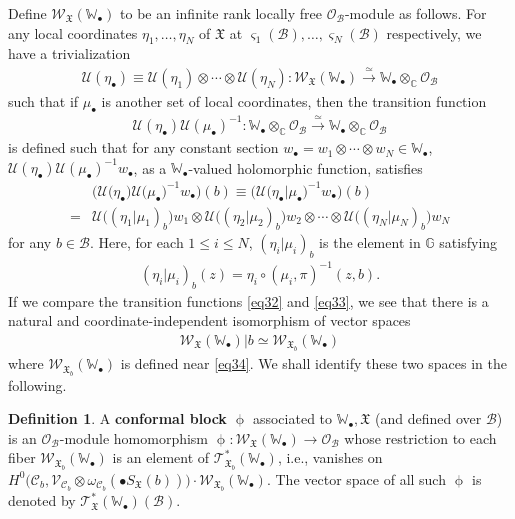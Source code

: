\documentclass[11pt,b5paper,notitlepage]{article}
\theoremstyle{definition}
\newtheorem{df}{Definition}[section]
\theoremstyle{plain}
\newcommand{\fk}{\mathfrak}
\newcommand{\mc}{\mathcal}
\newcommand{\scr}{\mathscr}
\newcommand{\sgm}{\varsigma}
\newcommand{\SX}{S_{\fk X}}
\newcommand{\blt}{\bullet}
\newcommand{\Wbb}{\mathbb W}
\newcommand{\Gbb}{\mathbb G}
\newcommand{\Cbb}{\mathbb C}
\numberwithin{equation}{section}
\begin{document}
Define $\scr W_{\fk X}(\Wbb_\blt)$ \index{WX@$\scr W_{\fk X}(\Wbb_\blt)$} to be an infinite rank locally free $\scr O_{\mc B}$-module as follows. For any  local coordinates $\eta_1,\dots,\eta_N$ of $\fk X$ at $\sgm_1(\mc B),\dots,\sgm_N(\mc B)$ respectively, we have a trivialization \index{U@$\mc U(\eta_\blt)$}
\begin{align}
\mc U(\eta_\blt)\equiv \mc U(\eta_1)\otimes\cdots\otimes\mc U(\eta_N):\scr W_{\fk X}(\Wbb_\blt)\xrightarrow{\simeq}\Wbb_\blt\otimes_\Cbb\scr O_{\mc B}\label{eq37}
\end{align}
such that if $\mu_\blt$ is another set of local coordinates, then the transition function
\begin{align*}
\mc U(\eta_\blt)\mc U(\mu_\blt)^{-1}:\Wbb_\blt\otimes_\Cbb\scr O_{\mc B}\xrightarrow{\simeq}\Wbb_\blt\otimes_\Cbb\scr O_{\mc B}
\end{align*}
is defined such that for any constant section $w_\blt=w_1\otimes\cdots\otimes w_N\in\Wbb_\blt$, $\mc U(\eta_\blt)\mc U(\mu_\blt)^{-1}w_\blt$, as a $\Wbb_\blt$-valued holomorphic function, satisfies
\begin{align}
&\Big(\mc U\big(\eta_\blt\big)\mc U\big(\mu_\blt\big)^{-1}w_\blt\Big )(b)\equiv \Big(\mc U\big(\eta_\blt\big|\mu_\blt\big)^{-1}w_\blt\Big )(b)\nonumber\\
=&\mc U\big((\eta_1|\mu_1)_b \big)w_1\otimes\mc U\big((\eta_2|\mu_2)_b \big)w_2\otimes\cdots\otimes \mc U\big((\eta_N|\mu_N)_b \big)w_N \label{eq33}
\end{align}
for any $b\in \mc B$. Here, for each $1\leq i\leq N$, $(\eta_i|\mu_i)_b$ is the element in $\Gbb$ satisfying
\begin{align}
(\eta_i|\mu_i)_b(z)=\eta_i\circ(\mu_i,\pi)^{-1}(z,b).
\end{align}
If we compare the transition functions \eqref{eq32} and \eqref{eq33}, we see that there is a natural and coordinate-independent isomorphism of vector spaces
\begin{align*}
\scr W_{\fk X}(\Wbb_\blt)|b\simeq \scr W_{\fk X_b}(\Wbb_\blt)
\end{align*}
where $\scr W_{\fk X_b}(\Wbb_\blt)$ is defined near \eqref{eq34}. We shall identify these two spaces in the following.


\begin{df}\label{lb17}
A \textbf{conformal block} $\upphi$ associated to $\Wbb_\blt,\fk X$ (and defined over $\mc B$) is an $\scr O_{\mc B}$-module homomorphism $\upphi:\scr W_{\fk X}(\Wbb_\blt)\rightarrow\scr O_{\mc B}$ whose restriction to each fiber $\scr W_{\fk X_b}(\Wbb_\blt)$ is an element of $\scr T_{\fk X_b}^*(\Wbb_\blt)$, i.e., vanishes on $H^0\big(\mc C_b,\scr V_{\mc C_b}\otimes\omega_{\mc C_b}(\blt\SX(b))\big)\cdot\scr W_{\fk X_b}(\Wbb_\blt)$. The vector space of all such $\upphi$ is denoted \index{T@$\scr T_{\fk X}^*(\Wbb_\blt),\scr T_{\fk X}^*(\Wbb_\blt)(\mc B)$} by $\scr T_{\fk X}^*(\Wbb_\blt)(\mc B)$.
\end{df}
\end{document}
